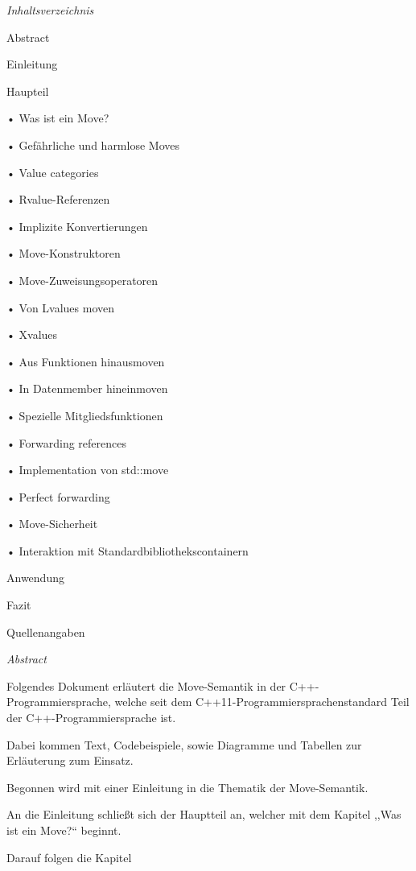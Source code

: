 \documentclass{article}
\begin{document}
\baselineskip=12pt
\emph{Inhaltsverzeichnis}

\vspace{12pt}
Abstract

\vspace{12pt}
Einleitung

\vspace{12pt}
Haupteil

• Was ist ein Move?

• Gefährliche und harmlose Moves

• Value categories

• Rvalue-Referenzen

• Implizite Konvertierungen

• Move-Konstruktoren

• Move-Zuweisungsoperatoren

• Von Lvalues moven

• Xvalues

• Aus Funktionen hinausmoven

• In Datenmember hineinmoven

• Spezielle Mitgliedsfunktionen

• Forwarding references

• Implementation von std::move

• Perfect forwarding

• Move-Sicherheit

• Interaktion mit Standardbibliothekscontainern

\vspace{12pt}
Anwendung

\vspace{12pt}
Fazit

\vspace{12pt}
Quellenangaben

\vspace{77pt}
\emph{Abstract }

Folgendes Dokument erläutert die Move-Semantik in der C++-Programmiersprache, 
welche seit dem C++11-Programmiersprachenstandard Teil der C++-Programmiersprache 
ist.

Dabei kommen Text, Codebeispiele, sowie Diagramme und Tabellen zur Erläuterung 
zum Einsatz.

Begonnen wird mit einer Einleitung in die Thematik der Move-Semantik.

An die Einleitung schließt sich der Hauptteil an, welcher mit dem Kapitel ,,Was 
ist ein Move?`` beginnt.

Darauf folgen die Kapitel 
\end{document}
